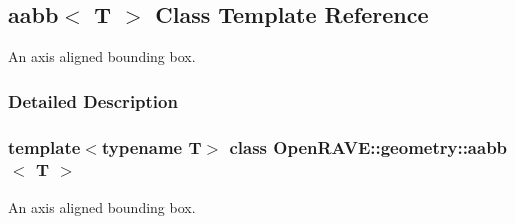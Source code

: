 \hypertarget{classOpenRAVE_1_1geometry_1_1aabb}{
\subsection{aabb$<$ T $>$ Class Template Reference}
\label{classOpenRAVE_1_1geometry_1_1aabb}
}


An axis aligned bounding box.  




\subsubsection{Detailed Description}
\subsubsection*{template$<$typename T$>$ class OpenRAVE::geometry::aabb$<$ T $>$}

An axis aligned bounding box. 